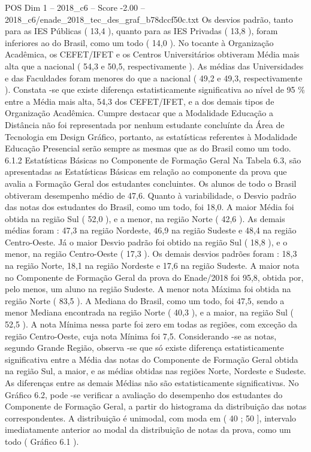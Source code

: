 \begin{textsample}{POS Dim 1 – 2018\_c6 – Score -2.00 – 2018\_c6/enade\_2018\_tec\_des\_graf\_b78dccf50c.txt}
Os desvios padrão, tanto para as IES Públicas ( 13,4 ), quanto para as IES Privadas ( 13,8 ), foram inferiores ao do Brasil, como um todo ( 14,0 ).
No tocante à Organização Acadêmica, os CEFET/IFET e os Centros Universitários obtiveram Média mais alta que a nacional ( 54,3 e 50,5, respectivamente ).
As médias das Universidades e das Faculdades foram menores do que a nacional ( 49,2 e 49,3, respectivamente ).
Constata -se que existe diferença estatisticamente significativa ao nível de 95 \% entre a Média mais alta, 54,3 dos CEFET/IFET, e a dos demais tipos de Organização Acadêmica.
Cumpre destacar que a Modalidade Educação a Distância não foi representada por nenhum estudante concluínte da Área de Tecnologia em Design Gráfico, portanto, as estatísticas referentes à Modalidade Educação Presencial serão sempre as mesmas que as do Brasil como um todo. 6.1.2 Estatísticas Básicas no Componente de Formação Geral Na Tabela 6.3, são apresentadas as Estatísticas Básicas em relação ao componente da prova que avalia a Formação Geral dos estudantes concluintes.
Os alunos de todo o Brasil obtiveram desempenho médio de 47,6.
Quanto à variabilidade, o Desvio padrão das notas dos estudantes do Brasil, como um todo, foi 18,0.
A maior Média foi obtida na região Sul ( 52,0 ), e a menor, na região Norte ( 42,6 ).
As demais médias foram : 47,3 na região Nordeste, 46,9 na região Sudeste e 48,4 na região Centro-Oeste.
Já o maior Desvio padrão foi obtido na região Sul ( 18,8 ), e o menor, na região Centro-Oeste ( 17,3 ).
Os demais desvios padrões foram : 18,3 na região Norte, 18,1 na região Nordeste e 17,6 na região Sudeste.
A maior nota no Componente de Formação Geral da prova do Enade/2018 foi 95,8, obtida por, pelo menos, um aluno na região Sudeste.
A menor nota Máxima foi obtida na região Norte ( 83,5 ).
A Mediana do Brasil, como um todo, foi 47,5, sendo a menor Mediana encontrada na região Norte ( 40,3 ), e a maior, na região Sul ( 52,5 ).
A nota Mínima nessa parte foi zero em todas as regiões, com exceção da região Centro-Oeste, cuja nota Mínima foi 7,5.
Considerando -se as notas, segundo Grande Região, observa -se que só existe diferença estatisticamente significativa entre a Média das notas do Componente de Formação Geral obtida na região Sul, a maior, e as médias obtidas nas regiões Norte, Nordeste e Sudeste.
As diferenças entre as demais Médias não são estatisticamente significativas.
No Gráfico 6.2, pode -se verificar a avaliação do desempenho dos estudantes do Componente de Formação Geral, a partir do histograma da distribuição das notas correspondentes.
A distribuição é unimodal, com moda em ( 40 ; 50 ], intervalo imediatamente anterior ao modal da distribuição de notas da prova, como um todo ( Gráfico 6.1 ).

\end{textsample}
